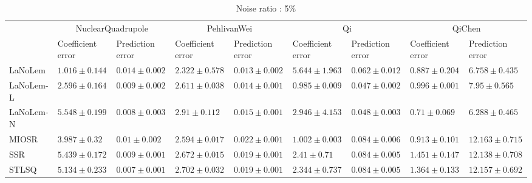 \begin{table*}
\centering
\caption{Noise ratio : 5\%}
\label{}
\scalebox{0.7}
{
\begin{tabular}{lllllllll}
\toprule
 & \multicolumn{2}{c}{NuclearQuadrupole} & \multicolumn{2}{c}{PehlivanWei} & \multicolumn{2}{c}{Qi} & \multicolumn{2}{c}{QiChen} \\
 & Coefficient error & Prediction error & Coefficient error & Prediction error & Coefficient error & Prediction error & Coefficient error & Prediction error \\
\midrule
LaNoLem & $\mathbf{1.016}\pm 0.144$ & $0.014\pm 0.002$ & $\mathbf{2.322}\pm 0.578$ & $\mathbf{0.013}\pm 0.002$ & $5.644\pm 1.963$ & $0.062\pm 0.012$ & $0.887\pm 0.204$ & $6.758\pm 0.435$ \\
LaNoLem-L & $2.596\pm 0.164$ & $0.009\pm 0.002$ & $2.611\pm 0.038$ & $0.014\pm 0.001$ & $\mathbf{0.985}\pm 0.009$ & $\mathbf{0.047}\pm 0.002$ & $0.996\pm 0.001$ & $7.95\pm 0.565$ \\
LaNoLem-N & $5.548\pm 0.199$ & $0.008\pm 0.003$ & $2.91\pm 0.112$ & $0.015\pm 0.001$ & $2.946\pm 4.153$ & $0.048\pm 0.003$ & $\mathbf{0.71}\pm 0.069$ & $\mathbf{6.288}\pm 0.465$ \\
MIOSR & $3.987\pm 0.32$ & $0.01\pm 0.002$ & $2.594\pm 0.017$ & $0.022\pm 0.001$ & $1.002\pm 0.003$ & $0.084\pm 0.006$ & $0.913\pm 0.101$ & $12.163\pm 0.715$ \\
SSR & $5.439\pm 0.172$ & $0.009\pm 0.001$ & $2.672\pm 0.015$ & $0.019\pm 0.001$ & $2.41\pm 0.71$ & $0.084\pm 0.005$ & $1.451\pm 0.147$ & $12.138\pm 0.708$ \\
STLSQ & $5.134\pm 0.233$ & $\mathbf{0.007}\pm 0.001$ & $2.702\pm 0.032$ & $0.019\pm 0.001$ & $2.344\pm 0.737$ & $0.084\pm 0.005$ & $1.364\pm 0.133$ & $12.157\pm 0.692$ \\

\midrule


\end{tabular}}
\end{table*}
